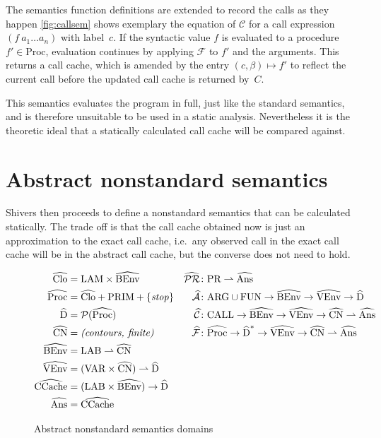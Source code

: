 \documentclass[a4paper,halfparskip,DIV=10,11pt]{scrbook}
\newcommand{\C}{\mathcal C}
\newcommand{\F}{\mathcal F}
\newcommand{\aC}{\widehat{\mathcal C}}
\newcommand{\aF}{\widehat{\mathcal F}}
\newcommand{\aPR}{\widehat{\mathcal {PR}}}
\newcommand{\aA}{\widehat{\mathcal A}}
\begin{document}
The semantics function definitions are extended to record the calls as they happen \vref{fig:callsem} shows exemplary the equation of $\C$ for a call expression $(f\ a_1\ldots a_n)$ with label~$c$. If the syntactic value $f$ is evaluated to a procedure $f'\in \text{Proc}$, evaluation continues by applying $\F$ to $f'$ and the arguments. This returns a call cache, which is amended by the entry $(c,\beta) \mapsto f'$ to reflect the current call before the updated call cache is returned by~$C$.

This semantics evaluates the program in full, just like the standard semantics, and is therefore unsuitable to be used in a static analysis. Nevertheless it is the theoretic ideal that a statically calculated call cache will be compared against.

\section{Abstract nonstandard semantics}

Shivers then proceeds to define a nonstandard semantics that can be calculated statically. The trade off is that the call cache obtained now is just an approximation to the exact call cache, i.e.\ any observed call in the exact call cache will be in the abstract call cache, but the converse does not need to hold.

\begin{figure}
\setlength{\FrameSep}{0pt}
\begin{framed}
\begin{align*}
\widehat{\text{Clo}} &= \text{LAM} \times \widehat{\text{BEnv}}
						& \aPR &\colon \text{PR} \rightharpoonup \widehat{\text{Ans}} \\
\widehat{\text{Proc}} &= \widehat{\text{Clo}} + \text{PRIM} + \{\text{\textit{stop}}\} 
						& \aA &\colon \text{ARG}\cup\text{FUN} \to \widehat{\text{BEnv}} \to \widehat{\text{VEnv}} \to \widehat{\text{D}} \\
\widehat{\text{D}} &= \mathcal P(\widehat{\text{Proc}})
						& \aC &\colon \text{CALL}\to \widehat{\text{BEnv}} \to \widehat{\text{VEnv}} \to \widehat{\text{CN}} \rightharpoonup \widehat{\text{Ans}} \\
\widehat{\text{CN}} &= \text{\textit{(contours, finite)}} 
						& \aF &\colon \widehat{\text{Proc}}\to \widehat{\text{D}}^* \to \widehat{\text{VEnv}} \to \widehat{\text{CN}} \rightharpoonup \widehat{\text{Ans}} \\
\widehat{\text{BEnv}} &= \text{LAB} \rightharpoonup \widehat{\text{CN}} \\
\widehat{\text{VEnv}} &= (\text{VAR}\times \widehat{\text{CN}}) \rightharpoonup \widehat{\text{D}} \\
\widehat{\text{CCache}} &= (\text{LAB} \times \widehat{\text{BEnv}}) \to \widehat{\text{D}} \\
\widehat{\text{Ans}} &= \widehat{\text{CCache}}
\end{align*}
\end{framed}
\caption{Abstract nonstandard semantics domains}
\label{fig:abssemdoms}
\end{figure}
\end{document}
